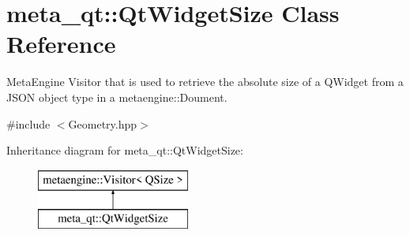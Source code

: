 \hypertarget{classmeta__qt_1_1_qt_widget_size}{\section{meta\-\_\-qt\-:\-:Qt\-Widget\-Size Class Reference}
\label{classmeta__qt_1_1_qt_widget_size}
}


Meta\-Engine Visitor that is used to retrieve the absolute size of a Q\-Widget from a J\-S\-O\-N object type in a metaengine\-::\-Doument.  




{\ttfamily \#include $<$Geometry.\-hpp$>$}

Inheritance diagram for meta\-\_\-qt\-:\-:Qt\-Widget\-Size\-:\begin{figure}[H]
\begin{center}
\leavevmode
\includegraphics[height=2.000000cm]{classmeta__qt_1_1_qt_widget_size}
\end{center}
\end{figure}
